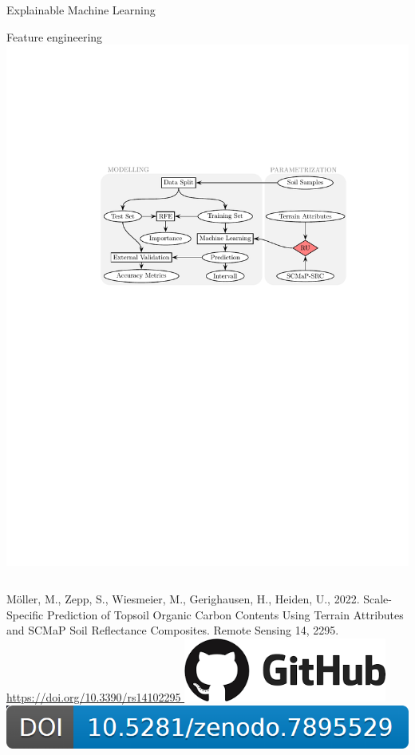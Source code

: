 \begin{frame}{Explainable Machine Learning}
\begin{block}{Feature engineering}
\centering\includegraphics[width=1\textwidth]{FIGURE/Figure_Flowchart2-KoBoS.pdf}
\end{block}

\begin{columns}
    \column{8cm}
    \raggedright\tiny  Möller, M., Zepp, S., Wiesmeier, M., Gerighausen, H., Heiden, U., 2022. Scale-Specific Prediction of Topsoil Organic Carbon Contents Using Terrain Attributes and SCMaP Soil Reflectance Composites. Remote Sensing 14, 2295. \url{https://doi.org/10.3390/rs14102295        }
    \column{3cm}
\href{https://github.com/FLFgit/ScaleP/wiki}{\centering\includegraphics[width=0.5\textwidth]{FIGURE/Github.png}}\\
\href{https://zenodo.org/record/7895529}{\centering\includegraphics[width=1\textwidth]{FIGURE/Zenodo.png}}
\end{columns}
\end{frame}


